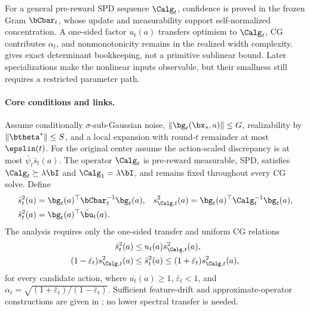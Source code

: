 For a general pre-reward SPD sequence $\Calg_t$, confidence is proved in the
frozen Gram $\bCbar_t$, whose update and measurability support self-normalized
concentration.  A one-sided factor $u_t(a)$ transfers optimism to $\Calg_t$,
CG contributes $\alpha_t$, and nonmonotonicity remains in the realized width
complexity.   gives exact determinant bookkeeping,
not a primitive sublinear bound.  Later specializations make the nonlinear
inputs observable, but their smallness still requires a restricted parameter
path.

\paragraph{Core conditions and links.}
Assume conditionally $\sigma$-sub-Gaussian noise, $\|\bg_t(\bx_s,a)\|\le G$,
realizability by $\|\btheta^*\|\le S$, and a local expansion with round-$t$
remainder at most $\epslin(t)$.  For the original center assume the
action-scaled discrepancy is at most $\bar\psi_t\bar s_t(a)$.  The operator
$\Calg_t$ is pre-reward measurable, SPD, satisfies $\Calg_t\succeq\lambda\bI$ and
$\Calg_1=\lambda\bI$, and remains fixed throughout every CG solve.  Define
\begin{equation}\label{eq:main-widths}
\begin{aligned}
 \bar s_t^2(a)&=\bg_t(a)^\top\bCbar_t^{-1}\bg_t(a),&
 s_{\Calg,t}^2(a)&=\bg_t(a)^\top\Calg_t^{-1}\bg_t(a),\\
 \tilde s_t^2(a)&=\bg_t(a)^\top\tilde\bu_t(a).&&
\end{aligned}
\end{equation}
The analysis requires only the one-sided transfer and uniform CG relations
\begin{equation}\label{eq:main-transfer-cg}
\begin{aligned}
 \bar s_t^2(a)&\le u_t(a)s_{\Calg,t}^2(a),\\
 (1-\bar\varepsilon_t)s_{\Calg,t}^2(a)&\le\tilde s_t^2(a)
 \le(1+\bar\varepsilon_t)s_{\Calg,t}^2(a),
\end{aligned}
\end{equation}
for every candidate action, where $u_t(a)\ge1$, $\bar\varepsilon_t<1$, and
$\alpha_t=\sqrt{(1+\bar\varepsilon_t)/(1-\bar\varepsilon_t)}$.  Sufficient
feature-drift and approximate-operator constructions are given in
; no lower spectral transfer is
needed.

